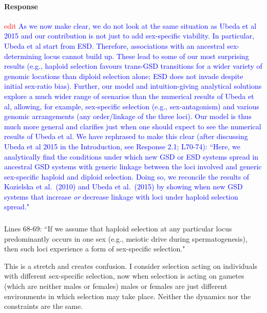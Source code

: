 \documentclass[10pt,letterpaper]{article}
\begin{document}
\noindent\paragraph{Response}
\textcolor{red}{edit}
\textcolor{blue}{
As we now make clear, we do not look at the same situation as Ubeda et al 2015 and our contribution is not just to add sex-specific viability. 
In particular, Ubeda et al start from ESD. 
Therefore, associations with an ancestral sex-determining locus cannot build up. 
These lead to some of our most surprising results (e.g., haploid selection favours trans-GSD transitions for a wider variety of genomic locations than diploid selection alone; ESD does not invade despite initial sex-ratio bias).
Further, our model and intuition-giving analytical solutions explore a much wider range of scenarios than the numerical results of Ubeda et al, allowing, for example, sex-specific selection (e.g., sex-antagonism) and various genomic arrangements (any order/linkage of the three loci).
Our model is thus much more general and clarifies just when one should expect to see the numerical results of Ubeda et al.
We have rephrased to make this clear (after discussing Ubeda et al 2015 in the Introduction, see Response 2.1; L70-74): ``Here, we analytically find the conditions under which new GSD or ESD systems spread in ancestral GSD systems with generic linkage between the loci involved and generic sex-specific haploid and diploid selection. 
Doing so, we reconcile the results of Kozielska et al.\ (2010) and Ubeda et al.\ (2015) by showing when new GSD systems that increase \textit{or} decrease linkage with loci under haploid selection spread."
}

\noindent\subsubsection{}
Lines 68-69: ``If we assume that haploid selection at any particular locus predominantly occurs in one sex (e.g., meiotic drive during spermatogenesis), then such loci experience a form of sex-specific selection." 

This is a stretch and creates confusion. I consider selection acting on individuals with different sex-specific selection, now when selection is acting on gametes (which are neither males or females) males or females are just different environments in which selection may take place. Neither the dynamics nor the constraints are the same. 
\end{document}
